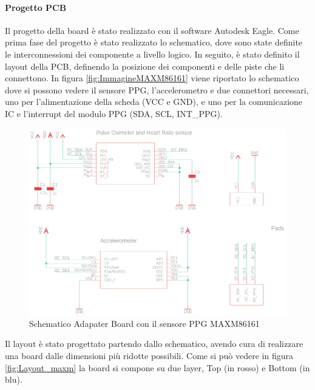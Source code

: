 \paragraph{Progetto PCB} Il progetto della board è stato realizzato con il software Autodesk Eagle. Come prima fase del progetto è stato realizzato lo schematico, dove sono state definite le interconnessioni dei componente a livello logico. In seguito, è stato definito il layout della PCB, definendo la posizione dei componenti e delle piste che li connettono.
In figura \ref{fig:ImmagineMAXM86161} viene riportato lo schematico dove si possono vedere il sensore PPG, l'accelerometro e due connettori necessari, uno per l'alimentazione della scheda (VCC e GND), e uno per la comunicazione IC e l'interrupt del modulo PPG (SDA, SCL, INT\_PPG).
\begin{figure}[b]
	\centering
	\includegraphics[width=0.8\linewidth]{ImageFiles/Hardware/schematic_maxm}
	\caption{Schematico Adapater Board con il sensore PPG MAXM86161}
	\label{fig:schematic_maxm}
\end{figure}
Il layout è stato progettato partendo dallo schematico, avendo cura di realizzare una board dalle dimensioni più ridotte possibili. Come si può vedere in figura \ref{fig:Layout_maxm} la board si compone su due layer, Top (in rosso) e Bottom (in blu).
